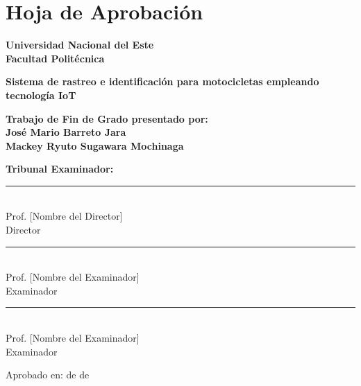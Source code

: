 \chapter*{Hoja de Aprobación}
\thispagestyle{empty}

\begin{center}
\large
\textbf{Universidad Nacional del Este}\\
\textbf{Facultad Politécnica}\\
\vspace{2cm}

\textbf{\Large Sistema de rastreo e identificación para motocicletas empleando tecnología IoT}
\vspace{2cm}

\textbf{Trabajo de Fin de Grado presentado por:}\\
\vspace{0.5cm}
\textbf{José Mario Barreto Jara}\\
\textbf{Mackey Ryuto Sugawara Mochinaga}
\vspace{3cm}

\textbf{Tribunal Examinador:}\\
\vspace{1cm}

\rule{6cm}{0.5pt}\\
Prof. [Nombre del Director]\\
Director\\
\vspace{1cm}

\rule{6cm}{0.5pt}\\
Prof. [Nombre del Examinador]\\
Examinador\\
\vspace{1cm}

\rule{6cm}{0.5pt}\\
Prof. [Nombre del Examinador]\\
Examinador\\
\vspace{2cm}

Aprobado en: \underline{\hspace{3cm}} de \underline{\hspace{3cm}} de \the\year
\end{center}
